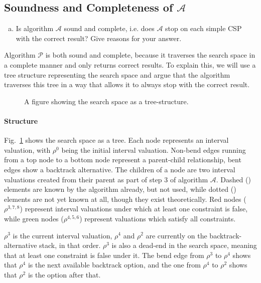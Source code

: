 \subsection{Soundness and Completeness of $\mathcal{A}$}
\begin{enumerate}[(b)]
\item Is algorithm $\mathcal{A}$ sound and complete, i.e. does $\mathcal{A}$ stop on each simple CSP with the correct result? Give reasons for your answer.
\end{enumerate}

Algorithm $\mathcal{P}$ is both sound and complete, because it traverses the search space in a complete manner and only returns correct results.
To explain this, we will use a tree structure representing the search space and argue that the algorithm traverses this tree in a way that allows it to always stop with the correct result.

\begin{figure}[H]
    \centering
    
    \caption{
        A figure showing the search space as a tree-structure.
    }
    \label{fig:search-tree}
\end{figure}


\paragraph{Structure}
Fig.~\ref{fig:search-tree} shows the search space as a tree.
Each node represents an interval valuation, with $\rho^0$ being the initial interval valuation.
Non-bend edges running from a top node to a bottom node represent a parent-child relationship, bent edges show a backtrack alternative.
The children of a node are two interval valuations created from their parent as part of step 3 of algorithm $\mathcal{A}$.
Dashed (\dashed) elements are known by the algorithm already, but not used, while dotted (\dotted) elements are not yet known at all, though they exist theoretically.
Red nodes ($\rho^{3,7,8}$) represent interval valuations under which at least one constraint is false, while green nodes ($\rho^{4,5,6}$) represent valuations which satisfy all constraints.

$\rho^3$ is the current interval valuation, $\rho^4$ and $\rho^2$ are currently on the backtrack-alternative stack, in that order.
$\rho^3$ is also a dead-end in the search space, meaning that at least one constraint is false under it.
The bend edge from $\rho^3$ to $\rho^4$ shows that $\rho^4$ is the next available backtrack option, and the one from $\rho^4$ to $\rho^2$ shows that $\rho^2$ is the option after that.

